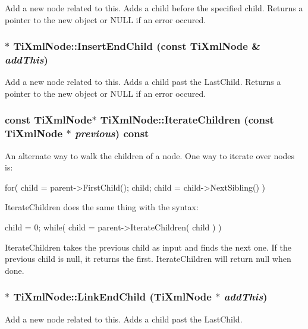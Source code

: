 \label{class_ti_xml_node_a0c146fa2fff0157b681594102f48cbc7}
Add a new node related to this. Adds a child before the specified child. Returns a pointer to the new object or NULL if an error occured. \hypertarget{class_ti_xml_node_ad7d4630e1a2a916edda16be22448a8ba}{
\subsubsection[{InsertEndChild}]{$\ast$ TiXmlNode::InsertEndChild (const {\bf TiXmlNode} \& {\em addThis})}}
\label{class_ti_xml_node_ad7d4630e1a2a916edda16be22448a8ba}
Add a new node related to this. Adds a child past the LastChild. Returns a pointer to the new object or NULL if an error occured. \hypertarget{class_ti_xml_node_a8621196ba3705fa226bef4a761cc51b6}{
\subsubsection[{IterateChildren}]{\setlength{\rightskip}{0pt plus 5cm}const {\bf TiXmlNode}$\ast$ TiXmlNode::IterateChildren (const {\bf TiXmlNode} $\ast$ {\em previous}) const}}
\label{class_ti_xml_node_a8621196ba3705fa226bef4a761cc51b6}
An alternate way to walk the children of a node. One way to iterate over nodes is: \begin{DoxyVerb}
			for( child = parent->FirstChild(); child; child = child->NextSibling() )
		\end{DoxyVerb}


IterateChildren does the same thing with the syntax: \begin{DoxyVerb}
			child = 0;
			while( child = parent->IterateChildren( child ) )
		\end{DoxyVerb}


IterateChildren takes the previous child as input and finds the next one. If the previous child is null, it returns the first. IterateChildren will return null when done. \hypertarget{class_ti_xml_node_a5d29442ae46de6d0168429156197bfc6}{
\subsubsection[{LinkEndChild}]{$\ast$ TiXmlNode::LinkEndChild ({\bf TiXmlNode} $\ast$ {\em addThis})}}
\label{class_ti_xml_node_a5d29442ae46de6d0168429156197bfc6}
Add a new node related to this. Adds a child past the LastChild.

